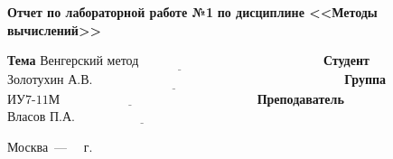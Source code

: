 \begin{titlepage}
	\begin{center}
		\noindent\begin{minipage}{1.1\textwidth}\centering
			\Large\textbf{  Отчет по лабораторной работе №1}\newline
			\textbf{по дисциплине <<Методы вычислений>>}\newline\newline
		\end{minipage}
	\end{center}
	
	\noindent\textbf{Тема} $\underline{\text{Венгерский метод~~~~~~~~~~~~~~~~~~~~~~~~~~~~~~~~~~~~~~~~~~~}}$\newline\newline
	\noindent\textbf{Студент} $\underline{\text{Золотухин А.В.~~~~~~~~~~~~~~~~~~~~~~~~~~~~~~~~~~~~~~~~~~~~~~~~~~~~~~~~~~~}}$\newline\newline
	\noindent\textbf{Группа} $\underline{\text{ИУ7-11М~~~~~~~~~~~~~~~~~~~~~~~~~~~~~~~~~~~~~~~~~~~~~~}}$\newline\newline
	\noindent\textbf{Преподаватель} $\underline{\text{Власов П.А.~~~~~~~~~~~~~~~~~~~~~~~~~~~~~~~~~~~~~~~~~~~~~~~~}}$\newline\newline\newline
	
\begin{center}
	\vfill
	Москва~---~\the\year
	~г.
\end{center}

\end{titlepage}